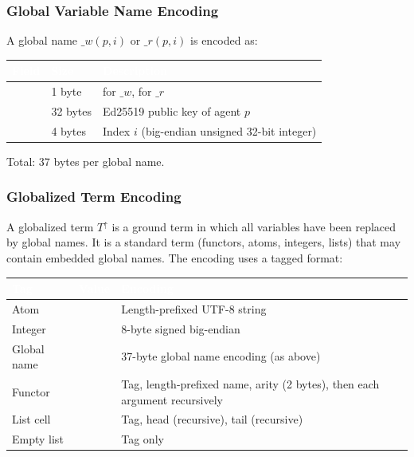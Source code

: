 \subsubsection{Global Variable Name Encoding}
A global name $\_w(p, i)$ or $\_r(p, i)$ is encoded as:
\begin{longtable}{L{3cm} L{3cm} L{7cm}}
\toprule
{}
\textcolor{white}{\textbf{Field}} &
\textcolor{white}{\textbf{Size}} &
\textcolor{white}{\textbf{Description}} \\
\midrule
\endhead
{} & 1 byte &  for $\_w$,  for $\_r$ \\
 & 32 bytes & Ed25519 public key of agent $p$ \\
 & 4 bytes & Index $i$ (big-endian unsigned 32-bit integer) \\
\bottomrule
\end{longtable}
Total: 37 bytes per global name.
\subsubsection{Globalized Term Encoding}
A globalized term $T^\uparrow$ is a ground term in which all variables have been replaced by global names. It is a standard term (functors, atoms, integers, lists) that may contain embedded global names. The encoding uses a tagged format:
\begin{longtable}{L{3cm} L{2.5cm} L{7.5cm}}
\toprule
{}
\textcolor{white}{\textbf{Tag}} &
\textcolor{white}{\textbf{Value}} &
\textcolor{white}{\textbf{Encoding}} \\
\midrule
\endhead
Atom &  & Length-prefixed UTF-8 string \\
Integer &  & 8-byte signed big-endian \\
Global name &  & 37-byte global name encoding (as above) \\
Functor &  & Tag, length-prefixed name, arity (2 bytes), then each argument recursively \\
List cell &  & Tag, head (recursive), tail (recursive) \\
Empty list &  & Tag only \\
\bottomrule
\end{longtable}
